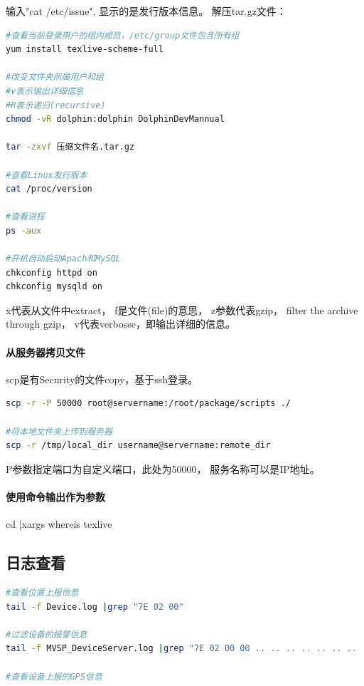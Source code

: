 \documentclass{book}
\begin{document}
输入"cat /etc/issue", 显示的是发行版本信息。
解压tar.gz文件：

\begin{lstlisting}[language=Bash]
#查看当前登录用户的组内成员，/etc/group文件包含所有组
yum install texlive-scheme-full

#改变文件夹所属用户和组
#v表示输出详细信息
#R表示递归(recursive)
chmod -vR dolphin:dolphin DolphinDevMannual

tar -zxvf 压缩文件名.tar.gz

#查看Linux发行版本
cat /proc/version

#查看进程
ps -aux

#开机自动启动Apach和MySQL
chkconfig httpd on
chkconfig mysqld on
\end{lstlisting}

x代表从文件中extract，
f是文件(file)的意思，
z参数代表gzip，
filter the archive through gzip，
v代表verbosse，即输出详细的信息。

\paragraph{从服务器拷贝文件}

scp是有Security的文件copy，基于ssh登录。 

\begin{lstlisting}[language=Bash]
scp -r -P 50000 root@servername:/root/package/scripts ./

#将本地文件夹上传到服务器
scp -r /tmp/local_dir username@servername:remote_dir
\end{lstlisting}

P参数指定端口为自定义端口，此处为50000，
服务名称可以是IP地址。

\paragraph{使用命令输出作为参数}

cd |xargs whereis texlive

\subsection{日志查看}

\begin{lstlisting}[language=Bash]
#查看位置上报信息
tail -f Device.log |grep "7E 02 00"

#过滤设备的报警信息
tail -f MVSP_DeviceServer.log |grep "7E 02 00 00 .. .. .. .. .. .. .. .. .. [^0][^0] [^0][^0] [^0][^0] [^0][^0]"

#查看设备上报的GPS信息

\end{lstlisting}
\end{document}
